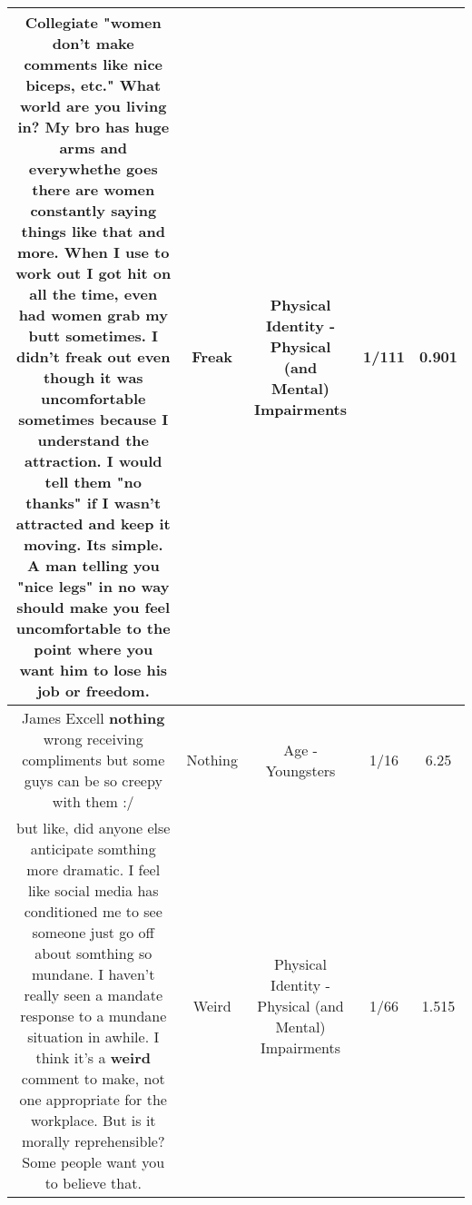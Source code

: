 \documentclass[11pt]{article}
\newlength\mylength
\begin{document}
\begin{center}
\begin{longtable}{|C{.65\mylength}|C{.30\mylength}|C{.12\mylength}|C{.12\mylength}|C{.12\mylength}|}
  \small Collegiate "women don't make comments like nice biceps, etc." What world are you living in? My bro has huge arms and everywhethe goes there are women constantly saying things like that and more. When I use to work out I got hit on all the time, even had women grab my butt sometimes. I didn't \textbf{freak} out even though it was uncomfortable sometimes because I understand the attraction. I would tell them "no thanks" if I wasn't attracted and keep it moving. Its simple. A man telling you "nice legs" in no way should make you feel uncomfortable to the point where you want him to lose his job or freedom.\normalsize   & Freak & Physical Identity - Physical (and Mental) Impairments & 1/111 & 0.901 \\  \hline
  \small James Excell \textbf{nothing} wrong receiving compliments but some guys can be so creepy with them :/\normalsize   & Nothing & Age - Youngsters & 1/16 & 6.25 \\  \hline
  \small but like, did anyone else anticipate somthing more dramatic. I feel like social media has conditioned me to see someone just go off about somthing so mundane. I haven't really seen a mandate response to a mundane situation in awhile. I think it's a \textbf{weird} comment to make, not one appropriate for the workplace. But is it morally reprehensible? Some people want you to believe that.\normalsize   & Weird & Physical Identity - Physical (and Mental) Impairments & 1/66 & 1.515 \\  \hline

\end{longtable}
\end{center}
\end{document}
